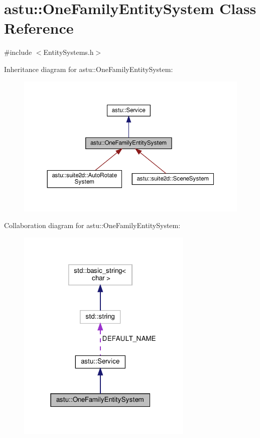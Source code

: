 \hypertarget{classastu_1_1OneFamilyEntitySystem}{}\section{astu\+:\+:One\+Family\+Entity\+System Class Reference}
\label{classastu_1_1OneFamilyEntitySystem}


{\ttfamily \#include $<$Entity\+Systems.\+h$>$}



Inheritance diagram for astu\+:\+:One\+Family\+Entity\+System\+:\nopagebreak
\begin{figure}[H]
\begin{center}
\leavevmode
\includegraphics[width=350pt]{classastu_1_1OneFamilyEntitySystem__inherit__graph}
\end{center}
\end{figure}


Collaboration diagram for astu\+:\+:One\+Family\+Entity\+System\+:\nopagebreak
\begin{figure}[H]
\begin{center}
\leavevmode
\includegraphics[width=238pt]{classastu_1_1OneFamilyEntitySystem__coll__graph}
\end{center}
\end{figure}
